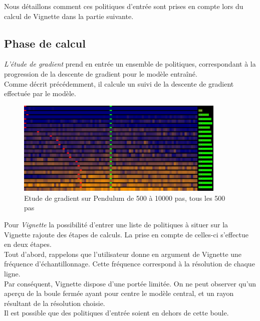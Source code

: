 \documentclass[12pt]{article}
\begin{document}
\newpage

Nous détaillons comment ces politiques d'entrée sont prises en compte lors du calcul de Vignette dans la partie suivante. \\

\subsection{Phase de calcul}

\emph{L'étude de gradient} prend en entrée un ensemble de politiques, correspondant à la progression de la descente de gradient pour le modèle entraîné. \\

Comme décrit précédemment, il calcule un suivi de la descente de gradient effectuée par le modèle. \\

\begin{figure}[htp]
    \centering
    \includegraphics[width=10cm]{Images/gradientStudy}
    \caption{Etude de gradient sur Pendulum de 500 à 10000 pas, tous les 500 pas}
    \label{fig:gradientStudy}
\end{figure}

\newpage

Pour \emph{Vignette} la possibilité d'entrer une liste de politiques à situer sur la Vignette rajoute des étapes de calculs. La prise en compte de celles-ci s'effectue en deux étapes. \\

Tout d'abord, rappelons que l'utilisateur donne en argument de Vignette une fréquence d'échantillonnage. Cette fréquence correspond à la résolution de chaque ligne. \\

Par conséquent, Vignette dispose d'une portée limitée. On ne peut observer qu'un aperçu de la boule fermée ayant pour centre le modèle central, et un rayon résultant de la résolution choisie. \\

Il est possible que des politiques d'entrée soient en dehors de cette boule. \\
\end{document}
